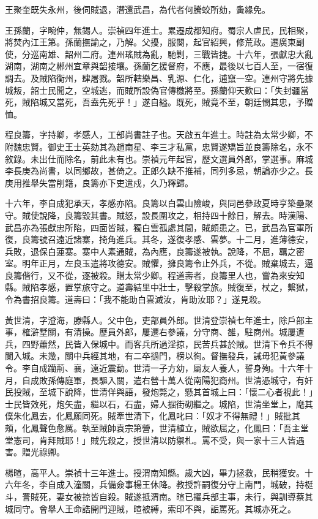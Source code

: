 \begin{pinyinscope}
王聚奎既失永州，後伺賊退，潛還武昌，為代者何騰蛟所劾，夤緣免。

王孫蘭，字畹仲，無錫人。崇禎四年進士。累遷成都知府。蜀宗人虐民，民相聚，將焚內江王第。孫蘭撫諭之，乃解。父擾，服闋，起官紹興，修荒政。遷廣東副使，分巡南雄、韶州二府。連州瑤賊為亂，馳剿，三戰皆捷。十六年，張獻忠大亂湖南，湖南之郴州宜章與韶接壤。孫蘭乞援督府，不應，最後以七百人至，一宿復調去。及賊陷衡州，肆屠戮。韶所轄樂昌、乳源、仁化，逋竄一空。連州守將先據城叛，韶士民聞之，空城逃，而賊所設偽官傳檄將至。孫蘭仰天歎曰：「失封疆當死，賊陷城又當死，吾盍先死乎！」遂自縊。既死，賊竟不至，朝廷憫其忠，予贈恤。

程良籌，字持卿，孝感人，工部尚書註子也。天啟五年進士。時註為太常少卿，不附魏忠賢。御史王士英劾其為趙南星、李三才私黨，忠賢遂矯旨並良籌除名，永不敘錄。未出仕而除名，前此未有也。崇禎元年起官，歷文選員外郎，掌選事。麻城李長庚為尚書，以同鄉故，甚倚之。正郎久缺不推補，同列多忌，朝論亦少之。長庚用推舉失當削籍，良籌亦下吏遣戍，久乃釋歸。

十六年，李自成犯承天，孝感亦陷。良籌以白雲山險峻，與同邑參政夏時亨築壘聚守。賊使說降，良籌毀其書。賊怒，設長圍攻之，相持四十餘日，解去。時漢陽、武昌亦為張獻忠所陷，四面皆賊，獨白雲孤處其間，賊頗患之。已，武昌為官軍所復，良籌號召遠近諸寨，掎角進兵。其冬，遂復孝感、雲夢。十二月，進薄德安，兵敗，退保白蓮寨。寨中人素通賊，為內應，良籌遂被執。說降，不屈，羈之密室。明年正月，左良玉遣將攻德安。賊懼，擁良籌令止外兵，不從。賊棄城去，逼良籌偕行，又不從，逐被殺。贈太常少卿。程道壽者，良籌里人也，嘗為來安知縣。賊陷孝感，置掌旅守之。道壽結里中壯士，擊殺掌旅。賊復至，杖之，繫獄，令為書招良籌。道壽曰：「我不能助白雲滅汝，肯助汝耶？」遂見殺。

黃世清，字澄海，滕縣人。父中色，吏部員外郎。世清登崇禎七年進士，除戶部主事，榷滸墅關，有清操。歷員外郎，屢遷右參議，分守商、雒，駐商州。城屢遭兵，四野蕭然，民皆入保城中。而客兵所過淫掠，民苦兵甚於賊。世清下令兵不得闌入城。未幾，關中兵經其地，有二卒撾門，榜以徇。督撫發兵，誡毋犯黃參議令。李自成躪荊、襄，遠近震動。世清一子方幼，屬友人養人，誓身殉。十六年十月，自成敗孫傳庭軍，長驅入關，遣右營十萬人從南陽犯商州。世清憑城守，有奸民投賊，至城下說降，世清佯與語，發炮斃之，懸其首城上曰：「懷二心者視此！」士民皆效死，炮矢盡，繼以石，石盡，婦人掘街砌繼之。城陷，世清坐堂上，麾其僕朱化鳳去，化鳳願同死。賊牽世清下，化鳳叱曰：「奴才不得無禮！」賊批其頰，化鳳聲色愈厲。執至賊帥袁宗第營，世清植立，賊欲屈之，化鳳曰：「吾主堂堂憲司，肯拜賊耶！」賊先殺之，授世清以防禦札。罵不受，與一家十三人皆遇害。贈光祿卿。

楊暄，高平人。崇禎十三年進士。授渭南知縣。歲大凶，畢力拯救，民稍獲安。十六年冬，李自成入潼關，兵備僉事楊王休降。教授許嗣復分守上南門，城破，持梃斗，詈賊死，妻女被掠皆自殺。賊遂抵渭南。暄已擢兵部主事，未行，與訓導蔡其城同守。會舉人王命誥開門迎賊，暄被縛，索印不與，詬罵死。其城亦死之。


\end{pinyinscope}
